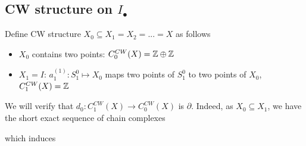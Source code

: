 \documentclass{article}
\begin{document}
\subsection{CW structure on $I_\bullet$}

Define CW structure $X_0 \subseteq X_1 = X_2 = ... = X$ as follows

\begin{itemize}
    \item $X_0$ contains two points: $C^{CW}_0(X) = \mathbb{Z} \oplus \mathbb{Z}$
    \item $X_1 = I$: $a^{(1)}_1: S^0_1 \mapsto X_0$ maps two points of $S^0_1$ to two points of $X_0$, $C^{CW}_1(X) = \mathbb{Z}$
\end{itemize}

\begin{center}
\end{center}

We will verify that $d_0: C^{CW}_1(X) \to C^{CW}_0(X)$ is $\partial$. Indeed, as $X_0 \subseteq X_1$, we have the short exact sequence of chain complexes

\begin{center}
\end{center}

which induces

\begin{center}
\end{center}
\end{document}
